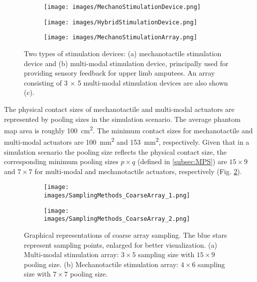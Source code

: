 \begin{figure}[htbp]
    \centering
    \begin{subfigure}[b]{0.3\textwidth}
        \texttt{[image: images/MechanoStimulationDevice.png]}
        \caption{}
    \end{subfigure}
    \hspace{0.1cm}
    \begin{subfigure}[b]{0.3\textwidth}
        \texttt{[image: images/HybridStimulationDevice.png]}
        \caption{}
    \end{subfigure}
    \begin{subfigure}[b]{0.3\textwidth}
        \texttt{[image: images/MechanoStimulationArray.png]}
        \caption{}
    \end{subfigure}    
    \caption{Two types of stimulation devices: (a) mechanotactile stimulation device and (b) multi-modal stimulation device,  principally used for providing sensory feedback for upper limb amputees. An array consisting of 3 $\times$ 5 multi-modal stimulation devices are also shown (c).}
    \label{fig:StimulationDevice}
\end{figure} 

The physical contact sizes of mechanotactile and multi-modal actuators are represented by pooling sizes in the simulation scenario. 
The average phantom map area is roughly \SI{100}{cm^2}. The minimum contact sizes for mechanotactile and multi-modal actuators are \SI{100}{mm^2} and \SI{153}{mm^2}, respectively. Given that in a simulation scenario the pooling size reflects the physical contact size, the corresponding minimum pooling sizes $p \times q$ (defined in \ref{subsec:MPS}) are $15 \times 9$ and $7 \times 7$ for multi-modal and mechanotactile actuators, respectively (Fig. \ref{fig:ExamplesCoarseArray_sampling}). 

\begin{figure}[hb]
    \centering
    \begin{subfigure}[b]{0.34\textwidth}
        \texttt{[image: images/SamplingMethods\_CoarseArray\_1.png]}
        \caption{}
    \end{subfigure}
    \hspace{0.1cm}
    \begin{subfigure}[b]{0.34\textwidth}
        \texttt{[image: images/SamplingMethods\_CoarseArray\_2.png]}
        \caption{}
    \end{subfigure}
    \caption{Graphical representations of coarse array sampling. The blue stars represent sampling points, enlarged for better visualization. (a) Multi-modal stimulation array: $3 \times 5$ sampling size with $15 \times 9$ pooling size. (b) Mechanotactile stimulation array: $4 \times 6$ sampling size with $7 \times 7$ pooling size.}
    \label{fig:ExamplesCoarseArray_sampling}
\end{figure} 



